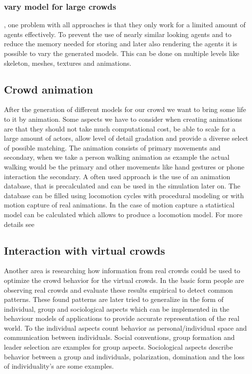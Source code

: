 \documentclass{acmsiggraph}               %
\begin{document}
\subsubsection{vary model for large crowds}, one problem with all approaches is that they only work for a limited amount of agents effectively. To prevent the use of nearly similar looking agents and to reduce the memory needed for storing and later also rendering the agents it is possible to vary the generated models. This can be done on multiple levels like skeleton, meshes, textures and animations. 
\cite{thalmann_crowd_2013}

\subsection{Crowd animation}

After the generation of different models for our crowd we want to bring some life to it by animation. Some aspects we have to consider when creating animations are that they should not take much computational cost,  be able to scale for a large amount of actors, allow level of detail gradation and provide a diverse select of possible matching. The animation consists of primary movements and secondary, when we take a person walking animation as example the actual walking would be the primary and other movements like hand gestures or phone interaction the secondary.
A often used approach is the use of an animation database, that is precalculated and can be used in the simulation later on. The database can be filled using locomotion cycles with procedural modeling or with motion capture of real animations. In the case of motion capture a statistical model can be calculated which allows to produce a locomotion model. For more details see \cite{thalmann_crowd_2013}

\subsection{Interaction with virtual crowds}

Another area is researching how information from real crowds could be used to optimize the crowd behavior for the virtual crowds. In the basic form people are observing real crowds and evaluate these results empirical to detect common patterns. These found patterns are later tried to generalize in the form of individual, group and sociological aspects which can be implemented in the behaviour models of applications to provide accurate representation of the real world. To the individual aspects count behavior as personal/individual space and communication between individuals. Social conventions, group formation and leader selection are examples for group aspects. Sociological aspects describe behavior between a group and individuals, polarization, domination and the loss of individuality's are some examples.  
\end{document}
